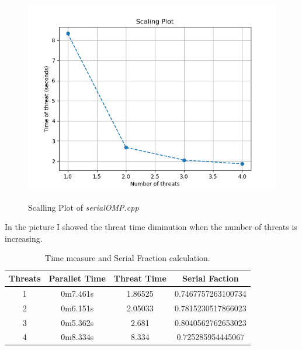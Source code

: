 \documentclass[]{article}
\begin{document}
\begin{itemize}
	\begin{figure}
		\centering\includegraphics[scale=1]{Scaling}
		\label{scalling}
		\caption{Scalling Plot of \textit{serialOMP.cpp}}
	\end{figure}
 	In the picture I showed the threat time diminution when the number of threats is increasing.
 	
 	 \begin{table}[h!]
 	 	\centering
 	 	\begin{tabular}{||c c c c||} 
 	 		\hline
 	 		Threats & Parallet Time & Threat Time & Serial Faction \\ [0.5ex] 
 	 		\hline\hline
 	 		1 &  0m7.461s  &    1.86525    &0.7467757263100734 \\ 
 	 		2 & 0m6.151s  &    2.05033   & 0.7815230517866023 \\
 	 		3 & 0m5.362s   &   2.681   &   0.8040562762653023 \\
 	 		4 &0m8.334s    &  8.334    &  0.725285954445067 \\[1ex] 
 	 		\hline
 	 	\end{tabular}
  	\label{table}
  	\caption{Time measure and Serial Fraction calculation.}
 	 \end{table}
\end{itemize}
\end{document}
